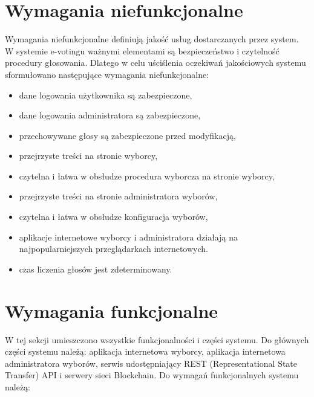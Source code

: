 \documentclass[a4paper,12pt]{book}
\begin{document}
\section {Wymagania niefunkcjonalne}

Wymagania niefunkcjonalne definiują jakość usług dostarczanych przez system. W systemie e-votingu ważnymi elementami są bezpieczeństwo i czytelność procedury głosowania. Dlatego w celu uściślenia oczekiwań jakościowych systemu sformułowano następujące wymagania niefunkcjonalne:

\begin{itemize}
	\item dane logowania użytkownika są zabezpieczone,
	\item dane logowania administratora są zabezpieczone,
	\item przechowywane głosy są zabezpieczone przed modyfikacją,
	\item przejrzyste treści na stronie wyborcy,
	\item czytelna i łatwa w obsłudze procedura wyborcza na stronie wyborcy,
	\item przejrzyste treści na stronie administratora wyborów,
	\item czytelna i łatwa w obsłudze konfiguracja wyborów,
	\item aplikacje internetowe wyborcy i administratora działają na najpopularniejszych przeglądarkach internetowych.
	\item czas liczenia głosów jest zdeterminowany.
\end{itemize}

\section {Wymagania funkcjonalne}

W tej sekcji umieszczono wszystkie funkcjonalności i części systemu. Do głównych części systemu należą: aplikacja internetowa wyborcy, aplikacja internetowa administratora wyborów,
serwis udostępniający REST (Representational State Transfer) API i serwery sieci Blockchain. Do wymagań funkcjonalnych systemu należą:
\end{document}
